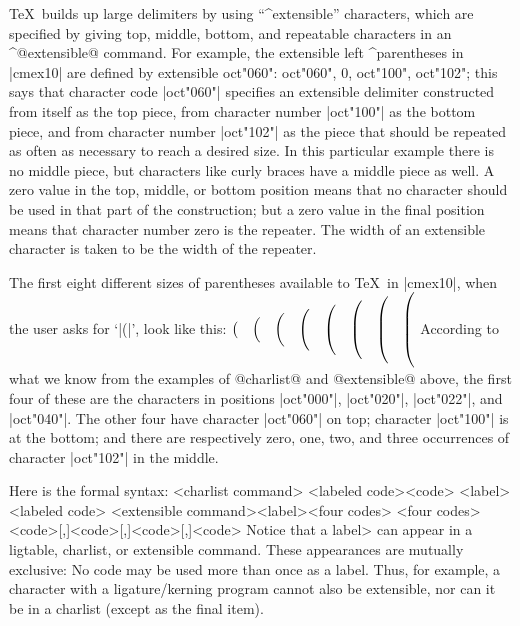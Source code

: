 \TeX\ builds up large delimiters by using ``^{extensible}'' characters,
which are specified by giving top, middle, bottom, and repeatable
characters in an ^@extensible@ command. For example, the extensible
left ^{parentheses} in |cmex10| are defined by
\begintt
extensible oct"060": oct"060", 0, oct"100", oct"102";
\endtt
this says that character code |oct"060"| specifies an extensible
delimiter constructed from itself as the top piece, from character number
|oct"100"| as the bottom piece, and from character number |oct"102"| as
the piece that should be repeated as often as necessary to reach
a desired size. In this particular example there is no middle
piece, but characters like curly braces have a middle piece as well.
A zero value in the top, middle, or bottom position means that
no character should be used in that part of the construction;
but a zero value in the final position means that character number zero
is the repeater. The width of an extensible character is taken to
be the width of the repeater. 

The first eight different sizes of parentheses available to \TeX\ in
|cmex10|, when the user asks for `|\left(|', look like this:
\begindisplay
$\bigl(\quad\Bigl(\quad\biggl(\quad\Biggl(\quad
\mathopen{\hbox{$\left(\vbox to20.5pt{}\right.\nulldelimiterspace=0pt$}}\quad
\mathopen{\hbox{$\left(\vbox to23.5pt{}\right.\nulldelimiterspace=0pt$}}\quad
\mathopen{\hbox{$\left(\vbox to26.5pt{}\right.\nulldelimiterspace=0pt$}}\quad
\mathopen{\hbox{$\left(\vbox to29.5pt{}\right.\nulldelimiterspace=0pt$}}$
\enddisplay
According to what we know from the examples of @charlist@ and @extensible@
above, the first four of these are the characters in positions
|oct"000"|, |oct"020"|, |oct"022"|, and |oct"040"|. The other four have
character |oct"060"| on top; character |oct"100"| is at the bottom;
and there are respectively zero, one, two, and three occurrences
of character |oct"102"| in the middle.

Here is the formal syntax:
\beginsyntax
<charlist command>
<labeled code>\is<code>
 \alt<label><labeled code>
<extensible command>\is[extensible]<label><four codes>
<four codes>\is<code>[,]<code>[,]<code>[,]<code>
\endsyntax
Notice that a \<label> can appear in a ligtable, charlist, or extensible
command. These appearances are mutually exclusive: No code may be used
more than once as a label. Thus, for example, a character with a
ligature/kerning program cannot also be extensible, nor can it be
in a charlist (except as the final item).

